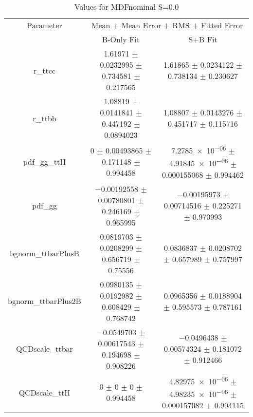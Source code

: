 \begin{table}
\centering
\caption{Values for MDFnominal S=0.0}
\begin{tabular}{ccc}
\toprule
Parameter & \multicolumn{2}{c}{Mean $\pm$ Mean Error $\pm$ RMS $\pm$ Fitted Error}\\
 & B-Only Fit & S+B Fit\\
\midrule
r\_ttcc & \num{1.61971} $\pm$ \num{0.0232995} $\pm$ \num{0.734581} $\pm$ \num{0.217565} & \num{1.61865} $\pm$ \num{0.0234122} $\pm$ \num{0.738134} $\pm$ \num{0.230627}\\
r\_ttbb & \num{1.08819} $\pm$ \num{0.0141841} $\pm$ \num{0.447192} $\pm$ \num{0.0894023} & \num{1.08807} $\pm$ \num{0.0143276} $\pm$ \num{0.451717} $\pm$ \num{0.115716}\\
pdf\_gg\_ttH & \num{0} $\pm$ \num{0.00493865} $\pm$ \num{0.171148} $\pm$ \num{0.994458} & \num{7.2785e-06} $\pm$ \num{4.91845e-06} $\pm$ \num{0.000155068} $\pm$ \num{0.994462}\\
pdf\_gg & \num{-0.00192558} $\pm$ \num{0.00780801} $\pm$ \num{0.246169} $\pm$ \num{0.965995} & \num{-0.00195973} $\pm$ \num{0.00714516} $\pm$ \num{0.225271} $\pm$ \num{0.970993}\\
bgnorm\_ttbarPlusB & \num{0.0819703} $\pm$ \num{0.0208299} $\pm$ \num{0.656719} $\pm$ \num{0.75556} & \num{0.0836837} $\pm$ \num{0.0208702} $\pm$ \num{0.657989} $\pm$ \num{0.757997}\\
bgnorm\_ttbarPlus2B & \num{0.0980135} $\pm$ \num{0.0192982} $\pm$ \num{0.608429} $\pm$ \num{0.768742} & \num{0.0965356} $\pm$ \num{0.0188904} $\pm$ \num{0.595573} $\pm$ \num{0.787161}\\
QCDscale\_ttbar & \num{-0.0549703} $\pm$ \num{0.00617543} $\pm$ \num{0.194698} $\pm$ \num{0.908226} & \num{-0.0496438} $\pm$ \num{0.00574324} $\pm$ \num{0.181072} $\pm$ \num{0.912466}\\
QCDscale\_ttH & \num{0} $\pm$ \num{0} $\pm$ \num{0} $\pm$ \num{0.994458} & \num{4.82975e-06} $\pm$ \num{4.98235e-06} $\pm$ \num{0.000157082} $\pm$ \num{0.994115}\\
\bottomrule
\end{tabular}
\end{table}